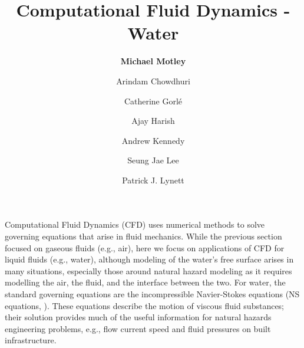 %
%
%


\title{Computational Fluid Dynamics - Water}
\author{
    \textbf{Michael Motley}
    \and Arindam Chowdhuri
    \and Catherine Gorlé
    \and Ajay Harish
    \and Andrew Kennedy
    \and Seung Jae Lee
    \and Patrick J. Lynett}
\tocauthor{}
%
%
\maketitle

Computational Fluid Dynamics (CFD) uses numerical methods to solve governing equations that arise in fluid mechanics. While the previous section focused on gaseous fluids (e.g., air), here we focus on applications of CFD for liquid fluids (e.g., water), although modeling of the water's free surface arises in many situations, especially those around natural hazard modeling as it requires modelling the air, the fluid, and the interface between the two. For water, the standard governing equations are the incompressible Navier-Stokes equations (NS equations, \citep{Darrigol2005navier}). These equations describe the motion of viscous fluid substances; their solution provides much of the useful information for natural hazards engineering problems, e.g., flow current speed and fluid pressures on built infrastructure.

